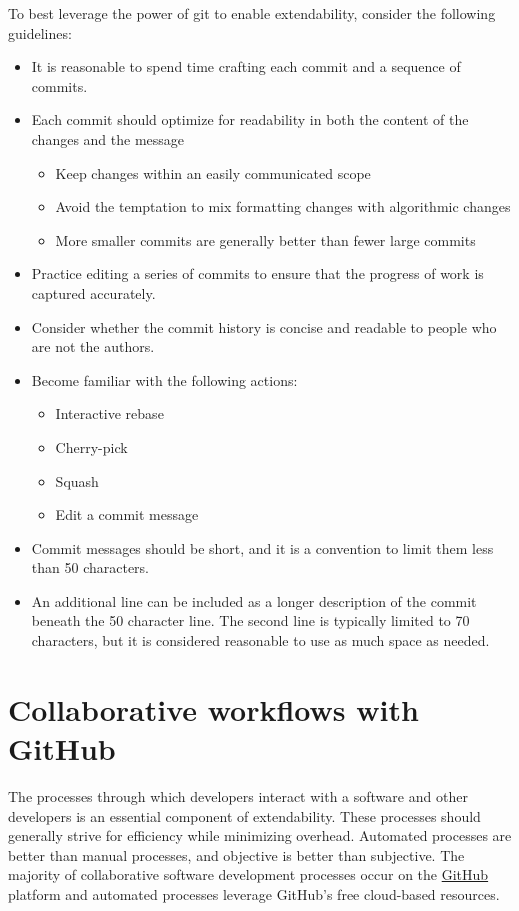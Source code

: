 \documentclass[]{nrel}
\begin{document}
To best leverage the power of git to enable extendability, consider the following guidelines:
\begin{itemize}
\item It is reasonable to spend time crafting each commit and a sequence of commits.
\item Each commit should optimize for readability in both the content of the changes and the message
\begin{itemize}
    \item Keep changes within an easily communicated scope
    \item Avoid the temptation to mix formatting changes with algorithmic changes
    \item More smaller commits are generally better than fewer large commits
\end{itemize}
\item Practice editing a series of commits to ensure that the progress of work is captured accurately.
\item Consider whether the commit history is concise and readable to people who are not the authors.
\item Become familiar with the following actions:
\begin{itemize}
    \item Interactive rebase
    \item Cherry-pick
    \item Squash
    \item Edit a commit message
\end{itemize}
\item Commit messages should be short, and it is a convention to limit them less than 50 characters.
\item An additional line can be included as a longer description of the commit beneath the
50 character line. The second line is typically limited to 70 characters, but it is
considered reasonable to use as much space as needed.

\end{itemize}


\section{Collaborative workflows with GitHub}
\label{sec:github}

The processes through which developers interact with a software and other developers is
an essential component of extendability.
These processes should generally strive for efficiency while minimizing overhead.
Automated processes are better than manual processes, and objective is better than subjective.
The majority of collaborative software development processes occur on the
\href{https://github.com}{GitHub} platform and automated processes leverage GitHub's free
cloud-based resources.
\end{document}
